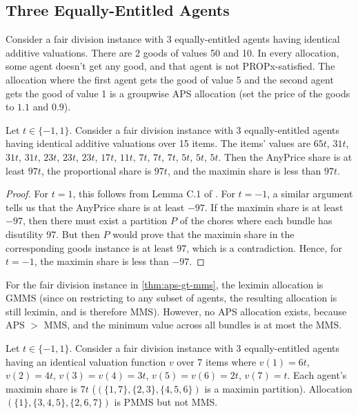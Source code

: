 \subsection{Three Equally-Entitled Agents}
\label{sec:cex-extra:3-eqEnt}

\begin{example}
\label{cex:gaps-not-propx}
Consider a fair division instance with 3 equally-entitled agents
having identical additive valuations. There are 2 goods of values 50 and 10.
In every allocation, some agent doesn't get any good, and that agent is not PROPx-satisfied.
The allocation where the first agent gets the good of value 5
and the second agent gets the good of value 1 is a groupwise APS allocation
(set the price of the goods to $1.1$ and $0.9$).
\end{example}

\begin{lemma}
\label{thm:aps-gt-mms}
Let $t \in \{-1, 1\}$.
Consider a fair division instance with 3 equally-entitled agents
having identical additive valuations over 15 items. The items' values are
$65t$, $31t$, $31t$, $31t$, $23t$, $23t$, $23t$, $17t$, $11t$, $7t$, $7t$, $7t$, $5t$, $5t$, $5t$.
Then the AnyPrice share is at least $97t$, the proportional share is $97t$,
and the maximin share is less than $97t$.
\end{lemma}
\begin{proof}
For $t = 1$, this follows from Lemma C.1 of \cite{babaioff2023fair}.
For $t = -1$, a similar argument tells us that the AnyPrice share is at least $-97$.
If the maximin share is at least $-97$, then there must exist a partition $P$ of the chores
where each bundle has disutility 97. But then $P$ would prove that the maximin share
in the corresponding goods instance is at least 97, which is a contradiction.
Hence, for $t = -1$, the maximin share is less than $-97$.
\end{proof}

\begin{example}
\label{cex:gmms-not-aps}
For the fair division instance in \cref{thm:aps-gt-mms},
the leximin allocation is GMMS (since on restricting to any subset of agents,
the resulting allocation is still leximin, and is therefore MMS).
However, no APS allocation exists, because APS $>$ MMS,
and the minimum value across all bundles is at most the MMS.
\end{example}

\begin{example}
\label{cex:pmms-not-mms}
Let $t \in \{-1, 1\}$.
Consider a fair division instance with 3 equally-entitled agents
having an identical valuation function $v$ over 7 items where
$v(1) = 6t$, $v(2) = 4t$, $v(3) = v(4) = 3t$, $v(5) = v(6) = 2t$, $v(7) = t$.
Each agent's maximin share is $7t$ ($(\{1, 7\}, \{2, 3\}, \{4, 5, 6\})$ is a maximin partition).
Allocation $(\{1\}, \{3, 4, 5\}, \{2, 6, 7\})$ is PMMS but not MMS.
\end{example}

